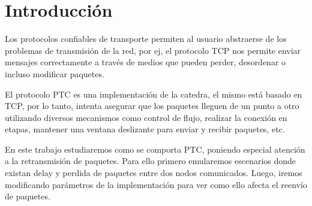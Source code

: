 \section{Introducci\'on}
    
    Los protocolos confiables de transporte permiten al usuario abstraerse 
    de los problemas de transmisi\'on de la red, por ej, el protocolo TCP 
    nos permite enviar mensajes correctamente a trav\'es de medios que pueden
    perder, desordenar o incluso modificar paquetes. 
    
    El protocolo PTC es una implementaci\'on de la catedra, el mismo est\'a 
    basado en TCP, por lo tanto, intenta asegurar que los paquetes lleguen de un
    punto a otro utilizando diversos mecanismos como control de flujo, realizar
    la conexi\'on en etapas, mantener una ventana deslizante para enviar 
    y recibir paquetes, etc. 
        
    En este trabajo estudiaremos como se comporta PTC, poniendo especial 
    atenci\'on a la retransmisi\'on de paquetes. Para ello 
    primero emularemos escenarios donde existan delay y perdida
    de paquetes entre dos nodos comunicados. Luego, iremos modificando
    par\'ametros de la implementaci\'on para ver como ello afecta el reenv\'io 
    de paquetes. 

